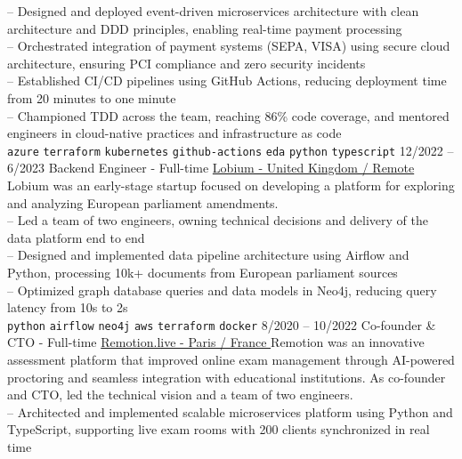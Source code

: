 \begin{entrylist}
{        -- Designed and deployed event-driven microservices architecture with clean architecture and DDD principles, enabling real-time payment processing \\
        -- Orchestrated integration of payment systems (SEPA, VISA) using secure cloud architecture, ensuring PCI compliance and zero security incidents \\
        -- Established CI/CD pipelines using GitHub Actions, reducing deployment time from 20 minutes to one minute \\
        -- Championed TDD across the team, reaching 86\% code coverage, and mentored engineers in cloud-native practices and infrastructure as code \\
        \texttt{azure}\slashsep
        \texttt{terraform}\slashsep
        \texttt{kubernetes}\slashsep
        \texttt{github-actions}\slashsep
        \texttt{eda}\slashsep
        \texttt{python}\slashsep
        \texttt{typescript}\slashsep
    }
    \entry
    {12/2022 -- 6/2023}
    {Backend Engineer - Full-time}
    {
        \href{https://www.linkedin.com/company/lobium/}{Lobium - United Kingdom / Remote}}
    {
        Lobium was an early-stage startup focused on developing a platform for exploring and analyzing European parliament amendments. \\
        -- Led a team of two engineers, owning technical decisions and delivery of the data platform end to end \\
        -- Designed and implemented data pipeline architecture using Airflow and Python, processing 10k+ documents from European parliament sources \\
        -- Optimized graph database queries and data models in Neo4j, reducing query latency from 10s to 2s \\
        \texttt{python}\slashsep
        \texttt{airflow}\slashsep
        \texttt{neo4j}\slashsep
        \texttt{aws}\slashsep
        \texttt{terraform}\slashsep
        \texttt{docker}\slashsep
    }
    \entry
    {8/2020 -- 10/2022}
    {Co-founder \& CTO - Full-time}
    {\href{https://remotion.live/}{Remotion.live - Paris / France }}
    {Remotion was an innovative assessment platform that improved online exam management through AI-powered proctoring and seamless integration with educational institutions. As co-founder and CTO, led the technical vision and a team of two engineers.\\
        -- Architected and implemented scalable microservices platform using Python and TypeScript, supporting live exam rooms with 200 clients synchronized in real time \\
}
\end{entrylist}
